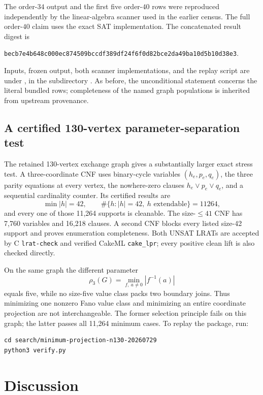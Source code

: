 \documentclass[11pt]{article}
\theoremstyle{definition}
\theoremstyle{remark}
\begin{document}
The order-\(34\) output and the first five order-\(40\) rows were reproduced
independently by the linear-algebra scanner used in the earlier census.
The full order-\(40\) claim uses the exact SAT implementation.  The
concatenated result digest is
\begin{center}
\texttt{becb7e4b648c000ec874509bccdf389df24f6f0d82bce2da49ba10d5b10d38e3}.
\end{center}
Inputs, frozen output, both scanner implementations, and the replay script
are under , in the subdirectory
.
As before, the unconditional statement concerns the literal bundled rows;
completeness of the named graph populations is inherited from upstream
provenance.

\subsection{A certified 130-vertex parameter-separation test}

The retained 130-vertex exchange graph gives a substantially larger exact
stress test.  A three-coordinate CNF uses binary-cycle variables
\((h_e,p_e,q_e)\), the three parity equations at every vertex, the
nowhere-zero clauses \(h_e\vee p_e\vee q_e\), and a sequential cardinality
counter.  Its certified results are
\[
 \min |h|=42,\qquad
 \#\{h:|h|=42,\ h\text{ extendable}\}=11264,
\]
and every one of those 11,264 supports is cleanable.  The size-\(\le41\)
CNF has 7,760 variables and 16,218 clauses.  A second CNF blocks every
listed size-42 support and proves enumeration completeness.  Both UNSAT
LRATs are accepted by C \texttt{lrat-check} and verified CakeML
\texttt{cake\_lpr}; every positive clean lift is also checked directly.

On the same graph the different parameter
\[
 \rho_3(G)=
 \min_{f,\ a\ne0}|f^{-1}(a)|
\]
equals five, while no size-five value class packs two boundary joins.
Thus minimizing one nonzero Fano value class and minimizing an entire
coordinate projection are not interchangeable.  The former selection
principle fails on this graph; the latter passes all 11,264 minimum cases.
To replay the package, run:
\begin{verbatim}
cd search/minimum-projection-n130-20260729
python3 verify.py
\end{verbatim}

\section{Discussion}
\end{document}
